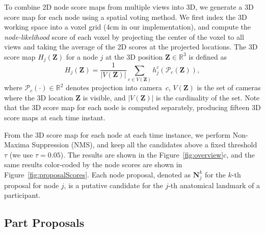To combine 2D node score maps from multiple views into 3D, we generate a 3D score map for each node using a spatial voting method. We first index the 3D working space into a voxel grid (4cm in our implementation), and compute the \textit{node-likelihood} score of each voxel by projecting the center of the voxel to all views and taking the average of the 2D scores at the projected locations. The 3D score map $H_j(\mathbf{Z})$ for a node $j$ at the 3D position $\mathbf{Z}\in\mathds{R}^3$ is defined as 
\begin{equation}
{H}_j(\mathbf{Z}) = \frac{1}{ | V(\mathbf{Z}) | } \sum_{c \in V(\mathbf{Z})} {h^c_j \left(\mathcal{P}_c({\mathbf{Z}}) \right) }  ,
\end{equation}
where $\mathcal{P}_c(\cdot)\in\mathds{R}^2$ denotes projection into camera~$c$, $V(\mathbf{Z})$ is the set of cameras where the 3D location $\mathbf{Z}$ is visible, and $| V(\mathbf{Z}) |$ is the cardinality of the set. Note that the 3D score map for each node is computed separately, producing fifteen 3D score maps at each time instant. 

From the 3D score map for each node at each time instance, we perform Non-Maxima Suppression (NMS), and keep all the candidates above a fixed threshold $\tau$ (we use $\tau{=}0.05$). The results are shown in the Figure~\ref{fig:overview}c, and the same results color-coded by the node scores are shown in Figure~\ref{fig:proposalScores}. Each node proposal, denoted as $\mathbf{N}_j^k$ for the $k$-th proposal for node $j$, is a putative candidate for the $j$-th anatomical landmark of a participant.


\subsection{Part Proposals}
\label{subsection:partProposals}

